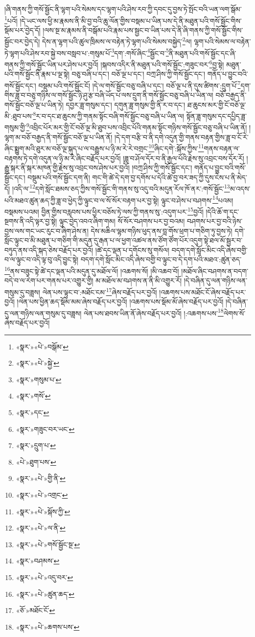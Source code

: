 །ཞི་གནས་ཀྱི་གསོ་སྦྱོང་ནི་ལྷག་པའི་སེམས་དང་ལྷག་པའི་ཤེས་རབ་ཀྱི་དབང་དུ་བྱས་ཏེ་སྤོང་བའི་ཡན་ལག་སྒོམ་\footnote{«སྣར་»«པེ་»བསྒོམ་}པའོ། །དེ་ཡང་ལས་ཕྱི་མ་རྣམས་ནི་མི་བྱ་བའི་ཆུ་ལོན་གྱིས་བསྡམ་པ་ཡིན་པས་དེ་ནི་མཐུན་པའི་གསོ་སྦྱོང་གིས་སྡོམ་པར་བྱེད་དོ། །ལས་སྔ་མ་རྣམས་ནི་བསྒོམ་པའི་རྣམ་པས་སྦྱང་བ་ཡིན་པས་དེ་ནི་ཞི་གནས་ཀྱི་གསོ་སྦྱོང་གིས་སྦྱོང་བར་བྱེད་དེ། དེས་ན་ལྷག་པའི་ཚུལ་ཁྲིམས་ལ་བརྟེན་ཏེ་ལྷག་པའི་སེམས་བསྐྱེད་\footnote{«སྣར་»«པེ་»སྐྱེ་}ལ། ལྷག་པའི་སེམས་ལ་བརྟེན་ཏེ་ལྷག་པའི་ཤེས་རབ་སྐྱེ་བས་བསླབ་པ་:གསུམ་པོ་\footnote{«སྣར་»གསུམ་པ་}དག་:གསོ་ཞིང་\footnote{«སྣར་»གསོ་}སྦྱོང་བ་\footnote{«སྣར་»དང་}ནི་མཐུན་པའི་གསོ་སྦྱོང་དང་ཞི་གནས་ཀྱི་གསོ་སྦྱོང་ཡིན་པར་ཤེས་པར་བྱའོ། །སྐབས་འདིར་ནི་མཐུན་པའི་གསོ་སྦྱོང་:གཟུང་བར་\footnote{«སྣར་»གཟུང་བར་ཡང་}བྱ་སྟེ། མཐུན་པའི་གསོ་སྦྱོང་ནི་རྣམ་པ་ལྔ་སྟེ། བཅུ་བཞི་པ་དང་། བཅོ་ལྔ་པ་དང་། བཀྲ་ཤིས་ཀྱི་གསོ་སྦྱོང་དང་། གནོད་པ་བྱུང་བའི་གསོ་སྦྱོང་དང་། བསྡུམ་པའི་གསོ་སྦྱོང་ངོ། །དེ་ལ་གསོ་སྦྱོང་བཅུ་བཞི་པ་དང་། བཅོ་ལྔ་པ་ནི་དུས་ཚིགས་:དྲུག་པོ་\footnote{«སྣར་»དྲུག་པ་}དག་གིས་ཟླ་བ་བཅུ་གཉིས་ལ་གསོ་སྦྱོང་ཉི་ཤུ་རྩ་བཞི་ཡོད་པ་ལས་དྲུག་ནི་གསོ་སྦྱོང་བཅུ་བཞི་པ་ཡིན་ལ། བཅོ་བརྒྱད་ནི་གསོ་སྦྱོང་བཅོ་ལྔ་པ་ཡིན་ཏེ། དབྱར་ཟླ་གསུམ་དང་། དགུན་ཟླ་གསུམ་གྱི་ནི་ར་བ་དང་། ཐ་ཆུངས་མར་གྱི་ངོ་བཅོ་ལྔ་མི་:ཐུབ་པས་\footnote{«པེ་»ཐུག་པས་}ར་བ་དང་ཐ་ཆུངས་ཀྱི་གནམ་སྟོང་བཞི་གསོ་སྦྱོང་བཅུ་བཞི་པ་ཡིན་ལ། སྟོན་ཟླ་གསུམ་དང་དཔྱིད་ཟླ་གསུམ་གྱི་\footnote{«སྣར་»«པེ་»གྱི་ནི་}འབྲིང་པོར་མར་གྱི་ངོ་བཅོ་ལྔ་མི་ཐུབ་པས་འབྲིང་པོའི་གནམ་སྟོང་གཉིས་གསོ་སྦྱོང་བཅུ་བཞི་པ་ཡིན་ནོ། །ལྷག་མ་བཅོ་བརྒྱད་ནི་གསོ་སྦྱོང་བཅོ་ལྔ་པ་ཡིན་ནོ། །དེ་དག་བརྩི་བ་ནི་དགེ་འདུན་གྱི་གནས་བརྟན་གྱིས་ཟླ་བ་ངོ་རེ་ཞིང་སྨྱུག་མའི་ཐུར་མ་བཅོ་ལྔ་སྐུད་པ་ལ་བརྒྱུས་པ་ཉི་མ་རེ་རེ་བགྲང་\footnote{«སྣར་»«པེ་»འགྲང་}ཞིང་དགེ་:སྐོས་ཀྱིས་\footnote{«སྣར་»«པེ་»སྐོས་ཀྱི་}གནས་བརྟན་ལ་བརྟགས་ཏེ་དགེ་འདུན་ལ་ཉི་མ་རེ་ཞིང་བརྗོད་པར་བྱའོ། །ཟླ་བ་ཤོལ་དོར་བ་ནི་རྒྱལ་པོའི་རྗེས་སུ་འབྲང་བས་དོར་རོ། །རྒྱུ་སྐར་ནི་སྐར་མཁན་གྱི་རྗེས་སུ་འབྲང་བས་ཤེས་པར་བྱའོ། །བཀྲ་ཤིས་ཀྱི་གསོ་སྦྱོང་དང་། གནོད་པ་བྱུང་བའི་གསོ་སྦྱོང་དང་། བསྡུམ་པའི་གསོ་སྦྱོང་དག་ནི། གང་གི་ཚེ་དེ་དག་བྱ་དགོས་པ་དེའི་ཚེ་བྱ་བར་ཟད་ཀྱི་དུས་ངེས་པ་ནི་མེད་དོ། །འདི་ལ་\footnote{«སྣར་»«པེ་»ལ་ནི་}དགེ་སློང་ཐམས་ཅད་ཀྱིས་གསོ་སྦྱོང་གི་གནས་སུ་འདུ་བའི་མདུན་རོལ་ཁོ་ནར་:གསོ་སྦྱོང་\footnote{«སྣར་»«པེ་»གསོ་སྦྱོང་སྔ་}མ་འདས་པའི་མཐའ་ཚུན་ཆད་ཀྱི་ཟླ་བ་ཕྱེད་ཀྱི་ལྟུང་བ་ལ་སོ་སོར་བརྟག་པར་བྱ་སྟེ། ལྟུང་བ་ཤེས་པ་བཤགས་\footnote{«སྣར་»བཤམས་}པའམ། བསྡམས་པའམ། བྱིན་གྱིས་བརླབས་པས་ཕྱིར་བཅོས་ཏེ་ལས་ཀྱི་གནས་སུ་:འདུག་པར་\footnote{«སྣར་»«པེ་»འདུ་བར་}བྱའོ། །དེའི་ཆོ་ག་དང་སྔགས་ནི་འདི་ལྟར་བྱ་སྟེ། ལྟུང་བྱེད་འབའ་ཞིག་གམ། སོ་སོར་བཤགས་པར་བྱ་བའམ། བཤགས་པར་བྱ་བའི་ཉེས་བྱས་ལས་གང་ཡང་རུང་བ་ཞིག་ཤེས་ན། དེས་མཆིལ་ལྷམ་གཉིས་ཕུད་ནས་བླ་གོས་ཕྲག་པ་གཅིག་ཏུ་བྱས་ཏེ། དགེ་སློང་ལྟུང་བ་མི་མཐུན་པ་གཅིག་གི་མདུན་དུ་རྒན་པ་ལ་ཕྱག་འཚལ་ནས་ཙོག་ཙོག་པོར་འདུག་སྟེ་ཐལ་མོ་སྦྱར་བ་བཏུད་ནས་འདི་སྐད་ཅེས་བརྗོད་པར་བྱའོ། །ཚེ་དང་ལྡན་པ་དགོངས་སུ་གསོལ། བདག་དགེ་སློང་མིང་འདི་ཞེས་བགྱི་བ་ལ་ལྟུང་བ་འདི་ལྟ་བུ་འདི་བྱུང་སྟེ། བདག་དགེ་སློང་མིང་འདི་ཞེས་བགྱི་བ་ལྟུང་བ་དེ་དག་པའི་མཐའ་:ཚུན་ཅད་\footnote{«སྣར་»«པེ་»ཚུན་ཆད་}ནས་བཟུང་སྟེ་ཚེ་དང་ལྡན་པའི་མདུན་དུ་མཐོལ་ལོ། །འཆགས་སོ། །མི་འཆབ་བོ། །མཐོལ་ཞིང་བཤགས་ན་བདག་བདེ་བ་ལ་རེག་པར་གནས་པར་འགྱུར་གྱི། མ་མཐོལ་མ་བཤགས་ན་ནི་མི་འགྱུར་རོ། །དེ་བཞིན་དུ་ལན་གཉིས་ལན་གསུམ་དུ་བཟླས། ལེན་པས་ལྟུང་བ་:མཐོང་ངམ་\footnote{«ཅོ་»མཐོང་ངོ་}ཞེས་བརྗོད་པར་བྱའོ། །འཆགས་པས་མཐོང་ངོ་ཞེས་བརྗོད་པར་བྱའོ། །ལེན་པས་ཕྱིན་ཆད་སྡོམ་མམ་ཞེས་བརྗོད་པར་བྱའོ། །འཆགས་པས་སྡོམ་མོ་ཞེས་བརྗོད་པར་བྱའོ། །དེ་བཞིན་དུ་ལན་གཉིས་ལན་གསུམ་དུ་བཟླས། ལེན་པས་ཐབས་ཡིན་ནོ་ཞེས་བརྗོད་པར་བྱའོ། །:འཆགས་པས་\footnote{«སྣར་»«པེ་»ཆགས་པས་}ལེགས་སོ་ཞེས་བརྗོད་པར་བྱའོ། 